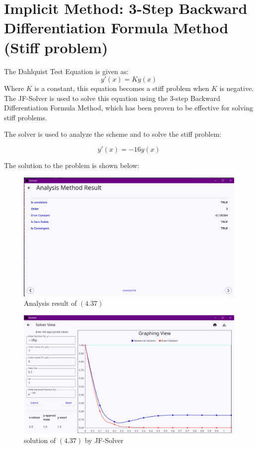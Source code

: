 \newpage

\section{Implicit Method: 3-Step Backward Differentiation Formula Method (Stiff problem)}


The Dahlquist Test Equation is given as:
\begin{equation}
    y'(x) = Ky(x)
\end{equation}
Where $K$ is a constant, this equation becomes a stiff problem when $K$ is negative. The JF-Solver is used to solve this equation using the 3-step Backward Differentiation Formula Method, which has been proven to be effective for solving stiff problems.

The solver is used to analyze the scheme and to solve the stiff problem:

\begin{equation}
y'(x) = -16y(x)
\end{equation}

The solution to the problem is shown below:

\begin{figure}[htbp]
    \centering
    \includegraphics[width=1\textwidth]{chapters/4/image/stiifa.png}
    \caption{Analysis result of $(4.37)$ }
\end{figure}


\begin{figure}[htbp]
    \centering
    \includegraphics[width=1\textwidth]{chapters/4/image/stiffb.png}
    \caption{solution of $(4.37)$ by JF-Solver}
\end{figure}

